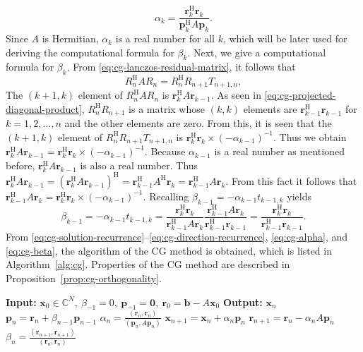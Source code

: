 \begin{equation}\label{eq:cg-alpha}\alpha_k=\frac{\bm r_k^{\mathrm H}\bm r_k}{\bm p_k^{\mathrm H}A\bm p_k}.\end{equation}
{Since $A$ is Hermitian, $\alpha_k$ is a real number for all $k$, which will be later used for deriving the computational formula for $\beta_k$.}
{Next, we give a computational formula for $\beta_k$. From \eqref{eq:cg-lanczos-residual-matrix}, it follows that}
\begin{equation}\label{eq:cg-residual-projected-matrix}R_n^{\mathrm H}AR_n=R_n^{\mathrm H}R_{n+1}T_{n+1,n},\end{equation}
{The $(k+1,k)$ element of $R_n^{\mathrm H}AR_n$ is $\bm r_k^{\mathrm H}A\bm r_{k-1}$. As seen in \eqref{eq:cg-projected-diagonal-product}, $R_n^{\mathrm H}R_{n+1}$ is a matrix whose $(k,k)$ elements are $\bm r_{k-1}^{\mathrm H}\bm r_{k-1}$ for $k=1,2,\ldots,n$ and the other elements are zero. From this, it is seen that the $(k+1,k)$ element of $R_n^{\mathrm H}R_{n+1}T_{n+1,n}$ is $\bm r_k^{\mathrm H}\bm r_k\times(-\alpha_{k-1})^{-1}$. Thus we obtain $\bm r_k^{\mathrm H}A\bm r_{k-1}=\bm r_k^{\mathrm H}\bm r_k\times(-\alpha_{k-1})^{-1}$. Because $\alpha_{k-1}$ is a real number as mentioned before, $\bm r_k^{\mathrm H}A\bm r_{k-1}$ is also a real number. Thus $\bm r_k^{\mathrm H}A\bm r_{k-1}=(\bm r_k^{\mathrm H}A\bm r_{k-1})^{\mathrm H}=\bm r_{k-1}^{\mathrm H}A^{\mathrm H}\bm r_k=\bm r_{k-1}^{\mathrm H}A\bm r_k$. From this fact it follows that $\bm r_{k-1}^{\mathrm H}A\bm r_k=\bm r_k^{\mathrm H}\bm r_k\times(-\alpha_{k-1})^{-1}$. Recalling $\beta_{k-1}=-\alpha_{k-1}t_{k-1,k}$ yields}
\begin{equation}\label{eq:cg-beta}
\beta_{k-1}=-\alpha_{k-1}t_{k-1,k}=\frac{\bm r_k^{\mathrm H}\bm r_k}{\bm r_{k-1}^{\mathrm H}A\bm r_k}\frac{\bm r_{k-1}^{\mathrm H}A\bm r_k}{\bm r_{k-1}^{\mathrm H}\bm r_{k-1}}=\frac{\bm r_k^{\mathrm H}\bm r_k}{\bm r_{k-1}^{\mathrm H}\bm r_{k-1}}.
\end{equation}
{From \eqref{eq:cg-solution-recurrence}--\eqref{eq:cg-direction-recurrence}, \eqref{eq:cg-alpha}, and \eqref{eq:cg-beta}, the algorithm of the CG method is obtained, which is listed in Algorithm\ \ref{alg:cg}. Properties of the CG method are described in Proposition\ \ref{prop:cg-orthogonality}.}
\begin{algorithm}[H]\caption{{The CG method}}\label{alg:cg}
\begin{algorithmic}[1]
\Statex\textbf{Input:} $\bm x_0\in\mathbb C^N,\ \beta_{-1}=0,\ \bm p_{-1}=\bm0,\ \bm r_0=\bm b-A\bm x_0$
\Statex\textbf{Output:} $\bm x_n$
\State $\bm p_n=\bm r_n+\beta_{n-1}\bm p_{n-1}$
\State $\alpha_n=\frac{(\bm r_n,\bm r_n)}{(\bm p_n,A\bm p_n)}$
\State $\bm x_{n+1}=\bm x_n+\alpha_n\bm p_n$
\State $\bm r_{n+1}=\bm r_n-\alpha_nA\bm p_n$
\State $\beta_n=\frac{(\bm r_{n+1},\bm r_{n+1})}{(\bm r_n,\bm r_n)}$
\EndFor\end{algorithmic}\end{algorithm}
